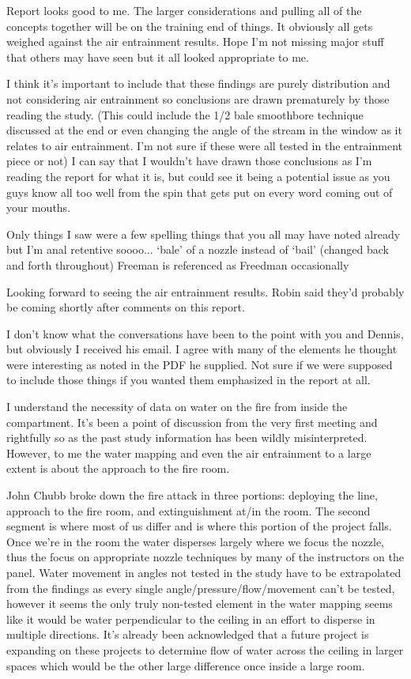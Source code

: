 \documentclass[12pt,oneside]{book}
\begin{document}
\begin{appendix}
Report looks good to me.  The larger considerations and pulling all of the concepts together will be on the training end of things.  It obviously all gets weighed against the air entrainment results.  Hope I'm not missing major stuff that others may have seen but it all looked appropriate to me. 
 
I think it's important to include that these findings are purely distribution and not considering air entrainment so conclusions are drawn prematurely by those reading the study.  (This could include the 1/2 bale smoothbore technique discussed at the end or even changing the angle of the stream in the window as it relates to air entrainment.  I'm not sure if these were all tested in the entrainment piece or not)  I can say that I wouldn't have drawn those conclusions as I'm reading the report for what it is, but could see it being a potential issue as you guys know all too well from the spin that gets put on every word coming out of your mouths.
 
Only things I saw were a few spelling things that you all may have noted already but I'm anal retentive soooo... 
`bale' of a nozzle instead of `bail' (changed back and forth throughout)
Freeman is referenced as Freedman occasionally
 
Looking forward to seeing the air entrainment results.  Robin said they'd probably be coming shortly after comments on this report.

\makebox[\linewidth]{\rule{\textwidth}{0.4pt}}

I don't know what the conversations have been to the point with you and Dennis, but obviously I received his email.  I agree with many of the elements he thought were interesting as noted in the PDF he supplied.  Not sure if we were supposed to include those things if you wanted them emphasized in the report at all.
 
I understand the necessity of data on water on the fire from inside the compartment.  It's been a point of discussion from the very first meeting and rightfully so as the past study information has been wildly misinterpreted.  However, to me the water mapping and even the air entrainment to a large extent is about the approach to the fire room.  
 
John Chubb broke down the fire attack in three portions:  deploying the line, approach to the fire room, and extinguishment at/in the room. The second segment is where most of us differ and is where this portion of the project falls.  Once we're in the room the water disperses largely where we focus the nozzle, thus the focus on appropriate nozzle techniques by many of the instructors on the panel.  Water movement in angles not tested in the study have to be extrapolated from the findings as every single angle/pressure/flow/movement can't be tested, however it seems the only truly non-tested element in the water mapping seems like it would be water perpendicular to the ceiling in an effort to disperse in multiple directions.  It's already been acknowledged that a future project is expanding on these projects to determine flow of water across the ceiling in larger spaces which would be the other large difference once inside a large room.
 

\end{appendix}
\end{document}
